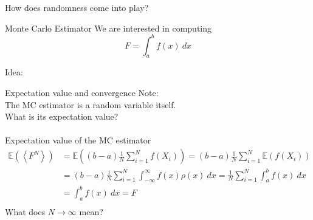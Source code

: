\documentclass{beamer}
\begin{document}
\begin{frame}{}

\begin{center}
\begin{large}
How does randomness come into play?
\end{large}    
\end{center}

\end{frame}


\begin{frame}{Monte Carlo Estimator}
We are interested in computing
$$
F=\int_a^b f(x)~dx
$$

Idea:\\ 


\end{frame}


\begin{frame}{Expectation value and convergence}
Note:\\
The MC estimator is a random variable itself.\\ 
What is its expectation value?\\
~\\
\pause
Expectation value of the MC estimator
\begin{equation*}
\begin{aligned}
\mathbb{E}(\left\langle
F^N
\right\rangle)
&=
\mathbb{E}
\left(
(b-a) \frac{1}{N} \sum_{i=1}^{N} f(X_i)
\right)
=
(b-a) \frac{1}{N} \sum_{i=1}^{N} 
\mathbb{E}
\left(
f(X_i)
\right)\\
&=
(b-a) \frac{1}{N} \sum_{i=1}^{N} 
\int_{-\infty}^\infty
f(x) \rho(x)~dx=
\frac{1}{N} \sum_{i=1}^{N} 
\int_a^b
f(x)~dx\\
&=
\int_a^b
f(x)~dx = F\\
\end{aligned}
\end{equation*}
What does $N\to \infty$ mean?

\end{frame}
\end{document}
